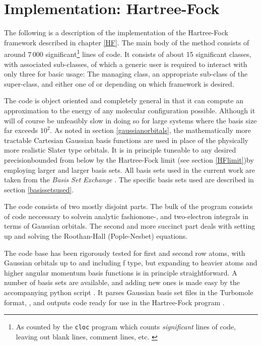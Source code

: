 \documentclass[../../master.tex]{subfiles}
\begin{document}
\chapter{Implementation: Hartree-Fock\label{HFI}}
The following is a description of the implementation of the Hartree-Fock framework described in chapter \ref{HF}. The main body of the method consists of around $7\,000$ significant\footnote{As counted by the \lstinline{cloc} program which counts \emph{significant} lines of code, leaving out blank lines, comment lines, etc. \cite{cloc}} lines of \CC{}  code. It consists of about 15 significant classes, with associated sub-classes, of which a generic user is required to interact with only three for basic usage: The managing  class, an appropriate sub-class of the  super-class, and either one of  or  depending on which framework is desired.

The code is object oriented and completely general in that it can compute an approximation to the energy of any molecular configuration possible. Although it will of course be unfeasibly slow in doing so for large systems where the basis size far exceeds $10^2$. As noted in section \ref{gaussianorbitals}, the mathematically more tractable Cartesian Gaussian basis functions are used in place of the physically more realistic Slater type orbitals. It is in principle tuneable to any desired precision\textemdash bounded from below by the Hartree-Fock limit (see section \ref{HFlimit})\textemdash by employing larger and larger basis sets. All basis sets used in the current work are taken from the \emph{Basis Set Exchange} \cite{basissetexchange}. The specific basis sets used are described in section \ref{basissetsused}.

The code consists of two mostly disjoint parts. The bulk of the program consists of code neccessary to solve\textemdash in analytic fashion\textemdash one-, and two-electron integrals in terms of Gaussian orbitals. The second and more succinct part deals with setting up and solving the Roothan-Hall (Pople-Nesbet) equations. 


The code base has been rigorously tested for first and second row atoms, with Gaussian orbitals up to and including f type, but expanding to heavier atoms and higher angular momentum basis functions is in principle straightforward. A number of basis sets are available, and adding new ones is made easy by the accompanying python script . It parses Gaussian basis set files in the Turbomole format, , and outputs \CC{}  code ready for use in the Hartree-Fock program \cite{TURBOMOLE}. 
\end{document}
